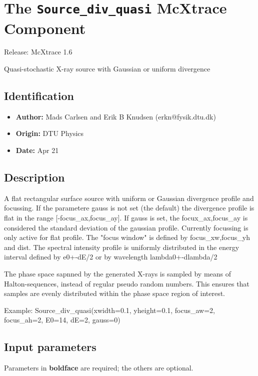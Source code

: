 \section{The \texttt{Source\_div\_quasi} McXtrace Component}
Release: McXtrace 1.6

Quasi-stochastic X-ray source with Gaussian or uniform divergence

\subsection*{Identification}
\begin{itemize}
  \item \textbf{Author:} Mads Carlsen and Erik B Knudsen (erkn@fysik.dtu.dk)
  \item \textbf{Origin:} DTU Physics
  \item \textbf{Date:} Apr 21
\end{itemize}

\subsection*{Description}
A flat rectangular surface source with uniform or Gaussian divergence profile and focussing. If the parametere gauss is not set (the default) the divergence profile is flat in the range [-focus\_ax,focus\_ay]. If gauss is set, the focux\_ax,focus\_ay is considered the standard deviation of the gaussian profile. Currently focussing is only active for flat profile. The "focus window" is defined by focus\_xw,focus\_yh and dist. The spectral intensity profile is uniformly distributed in the energy interval defined by e0+-dE/2 or by wavelength lambda0+-dlambda/2

The phase space sapnned by the generated X-rays is sampled by means of Halton-sequences, instead of regular pseudo random numbers. This ensures that samples are evenly distributed within the phase space region of interest.

Example: Source\_div\_quasi(xwidth=0.1, yheight=0.1, focus\_aw=2, focus\_ah=2, E0=14, dE=2, gauss=0)

\subsection*{Input parameters}
Parameters in \textbf{boldface} are required; the others are optional.

